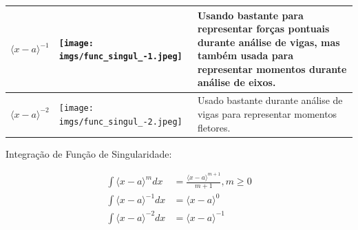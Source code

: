 \documentclass{article}
\begin{document}
\begin{table}[h]
\begin{tabularx}{\textwidth}{|X|X|l|}
        $\langle x - a\rangle^{-1}$                                    &
        \begin{minipage}{.3\textwidth}
            \centering
            \texttt{[image: imgs/func\_singul\_-1.jpeg]}
        \end{minipage} &
        \begin{minipage}{.4\textwidth}
            Usando bastante para representar forças pontuais durante análise de vigas, mas também usada para representar momentos durante análise de eixos.
        \end{minipage}                     \\ \hline

        $\langle x - a\rangle^{-2}$                                    &
        \begin{minipage}{.3\textwidth}
            \centering
            \texttt{[image: imgs/func\_singul\_-2.jpeg]}
        \end{minipage} &
        \begin{minipage}{.4\textwidth}
            Usado bastante durante análise de vigas para representar momentos fletores.
        \end{minipage}                                                                                         \\ \hline
    \end{tabularx}
\end{table}

Integração de Função de Singularidade:

\begin{minipage}{\textwidth}\tiny
    \begin{align*}
        \int \langle x-a\rangle^m dx    & = \frac{\langle x - a \rangle ^{m+1}}{m + 1}, m \ge 0 \\
        \int \langle x-a\rangle^{-1} dx & = \langle x - a \rangle^0                             \\
        \int \langle x-a\rangle^{-2} dx & = \langle x - a \rangle^{-1}                          \\
    \end{align*}
\end{minipage}
\end{document}

